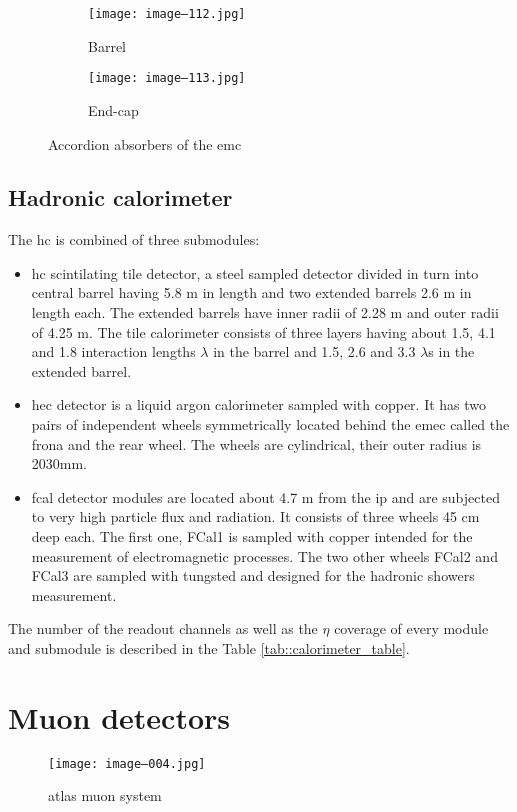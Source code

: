        \begin{figure}[htbp]
        			\begin{subfigure}[t]{0.48\textwidth}
        				\texttt{[image: image--112.jpg]}
        				\caption[Barrel]{Barrel}
        				\label{fig::barrel}
		\end{subfigure}
        		                \hfill
        \begin{subfigure}[t]{0.48\textwidth} 
				\texttt{[image: image--113.jpg]}
				\caption[End-cap]{End-cap}
				\label{fig::endcap}
		\end{subfigure}
			\caption{Accordion absorbers of the \gls{emc}}
			\label{fig::accordion}
		\end{figure}
	\subsection{Hadronic calorimeter }
	        The \gls{hc} is combined of three submodules:
	\begin{itemize}
		\item \gls{hc} scintilating tile detector, a steel sampled detector divided in turn into central barrel having 5.8 m in length and two extended barrels 2.6 m in length each. The extended barrels have inner radii of 2.28 m and outer radii of 4.25 m.  The tile calorimeter consists of three layers having about 1.5, 4.1 and 1.8 interaction lengths $\lambda$ in the barrel and 1.5, 2.6 and 3.3 $\lambda$s in the extended barrel. 
		\item \gls{hec} detector is a liquid argon calorimeter sampled with copper. It has two pairs of independent wheels symmetrically located behind the \gls{emec} called the frona and the rear wheel. The wheels are cylindrical, their outer radius is 2030mm. 
		\item \gls{fcal} detector modules are located about 4.7 m from the \gls{ip} and are subjected to very high particle flux and radiation. It consists of three wheels 45 cm deep each. The first one, FCal1 is sampled with copper intended for the measurement of electromagnetic processes. The two other wheels FCal2 and FCal3 are sampled with tungsted and designed for the hadronic showers measurement.
	\end{itemize}
	The number of the readout channels as well as the $\eta$ coverage of every module and submodule is described in the Table \ref{tab::calorimeter_table}.
	
\section{Muon detectors}
\label{sect::muons}
    \begin{figure}[htpb]
	\texttt{[image: image--004.jpg]}
	\caption{ \gls{atlas} muon system}
	\label{fig::muon_layout}
	\end{figure}

